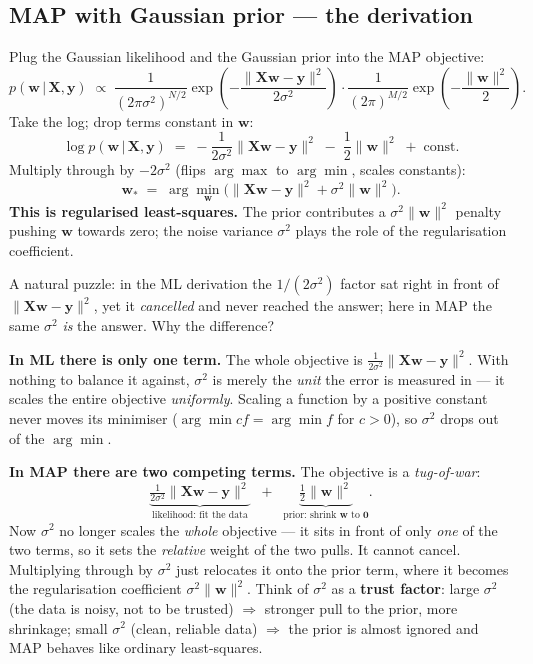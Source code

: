 \documentclass[11pt, a4paper]{article}
\begin{document}
\subsection{MAP with Gaussian prior — the derivation}

Plug the Gaussian likelihood and the Gaussian prior into the MAP objective:
\[
p(\mathbf{w}\,|\,\mathbf{X},\mathbf{y}) \;\propto\; \frac{1}{(2\pi\sigma^2)^{N/2}}\exp\!\left(-\frac{\|\mathbf{X}\mathbf{w}-\mathbf{y}\|^2}{2\sigma^2}\right) \cdot \frac{1}{(2\pi)^{M/2}}\exp\!\left(-\frac{\|\mathbf{w}\|^2}{2}\right).
\]
Take the log; drop terms constant in $\mathbf{w}$:
\[
\log p(\mathbf{w}\,|\,\mathbf{X},\mathbf{y}) \;=\; -\frac{1}{2\sigma^2}\|\mathbf{X}\mathbf{w}-\mathbf{y}\|^2 \;-\; \frac{1}{2}\|\mathbf{w}\|^2 \;+\; \text{const}.
\]
Multiply through by $-2\sigma^2$ (flips $\arg\max$ to $\arg\min$, scales constants):
\[
\mathbf{w}_* \;=\; \arg\min_\mathbf{w}\big(\|\mathbf{X}\mathbf{w}-\mathbf{y}\|^2 + \sigma^2\|\mathbf{w}\|^2\big).
\]
\textbf{This is regularised least-squares.} The prior contributes a $\sigma^2\|\mathbf{w}\|^2$ penalty pushing $\mathbf{w}$ towards zero; the noise variance $\sigma^2$ plays the role of the regularisation coefficient.

\begin{notebox}
A natural puzzle: in the ML derivation the $1/(2\sigma^2)$ factor sat right in front of $\|\mathbf{X}\mathbf{w}-\mathbf{y}\|^2$, yet it \emph{cancelled} and never reached the answer; here in MAP the same $\sigma^2$ \emph{is} the answer. Why the difference?

\textbf{In ML there is only one term.} The whole objective is $\tfrac{1}{2\sigma^2}\|\mathbf{X}\mathbf{w}-\mathbf{y}\|^2$. With nothing to balance it against, $\sigma^2$ is merely the \emph{unit} the error is measured in --- it scales the entire objective \emph{uniformly}. Scaling a function by a positive constant never moves its minimiser ($\arg\min cf = \arg\min f$ for $c>0$), so $\sigma^2$ drops out of the $\arg\min$.

\textbf{In MAP there are two competing terms.} The objective is a \emph{tug-of-war}:
\[
\underbrace{\tfrac{1}{2\sigma^2}\|\mathbf{X}\mathbf{w}-\mathbf{y}\|^2}_{\text{likelihood: fit the data}}
\;\;+\;\;
\underbrace{\tfrac{1}{2}\|\mathbf{w}\|^2}_{\text{prior: shrink }\mathbf{w}\text{ to }\mathbf{0}}.
\]
Now $\sigma^2$ no longer scales the \emph{whole} objective --- it sits in front of only \emph{one} of the two terms, so it sets the \emph{relative} weight of the two pulls. It cannot cancel. Multiplying through by $\sigma^2$ just relocates it onto the prior term, where it becomes the regularisation coefficient $\sigma^2\|\mathbf{w}\|^2$. Think of $\sigma^2$ as a \textbf{trust factor}: large $\sigma^2$ (the data is noisy, not to be trusted) $\Rightarrow$ stronger pull to the prior, more shrinkage; small $\sigma^2$ (clean, reliable data) $\Rightarrow$ the prior is almost ignored and MAP behaves like ordinary least-squares.
\end{notebox}
\end{document}
